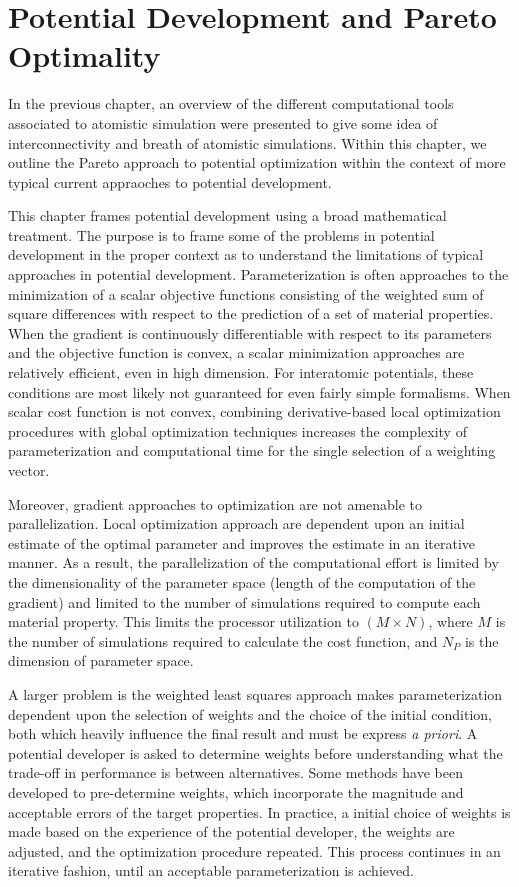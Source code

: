 \chapter{Potential Development and Pareto Optimality}
\label{ch:potential_development}

In the previous chapter, an overview of the different computational tools associated to atomistic simulation were presented to give some idea of interconnectivity and breath of atomistic simulations.  Within this chapter, we outline the Pareto approach to potential optimization within the context of more typical current appraoches to potential development.

This chapter frames potential development using a broad mathematical treatment.  The purpose is to frame some of the problems in potential development in the proper context as to understand the limitations of typical approaches in potential development.  Parameterization is often approaches to the minimization of a scalar objective functions consisting of the weighted sum of square differences with respect to the prediction of a set of material properties.  When the gradient is continuously differentiable with respect to its parameters and the objective function is convex, a scalar minimization approaches are relatively efficient, even in high dimension.  For interatomic potentials, these conditions are most likely not guaranteed for even fairly simple formalisms.  When scalar cost function is not convex, combining derivative-based local optimization procedures with global optimization techniques increases the complexity of parameterization and computational time for the single selection of a weighting vector.

Moreover, gradient approaches to optimization are not amenable to parallelization.  Local optimization approach are dependent upon an initial estimate of the optimal parameter and improves the estimate in an iterative manner.  As a result, the parallelization of the computational effort is limited by the dimensionality of the parameter space (length of the computation of the gradient) and limited to the number of simulations required to compute each material property.  This limits the processor utilization to $(M \times N)$, where $M$ is the number of simulations required to calculate the cost function, and $N_P$ is the dimension of parameter space.

A larger problem is the weighted least squares approach makes parameterization dependent upon the selection of weights and the choice of the initial condition, both which heavily influence the final result and must be express \emph{a priori}. A potential developer is asked to determine weights before understanding what the trade-off in performance is between alternatives.  Some methods have been developed to pre-determine weights, which incorporate the magnitude and acceptable errors of the target properties.  In practice, a initial choice of weights is made based on the experience of the potential developer, the weights are adjusted, and the optimization procedure repeated.  This process continues in an iterative fashion, until an acceptable parameterization is achieved.

